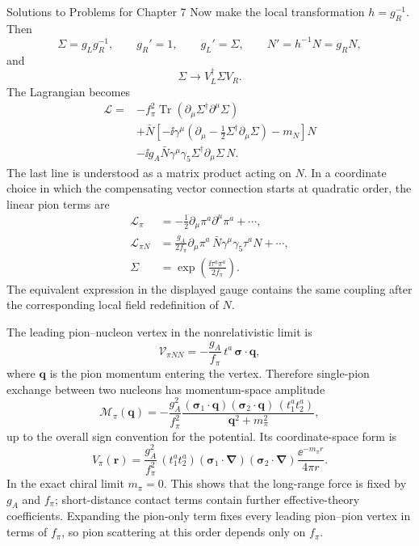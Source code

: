 \begin{bankssolutions}{Solutions to Problems for Chapter 7}
Now make the local transformation $h=g_R^{-1}$.  Then
\[
 \Sigma=g_Lg_R^{-1},\qquad g_R'=1,\qquad g_L'=\Sigma,\qquad
 N'=h^{-1}N=g_RN,
\]
and
\[
 \Sigma\longrightarrow V_L^\dagger\Sigma V_R.
\]
The Lagrangian becomes
\begin{align*}
 \mathcal L={}&-f_\pi^2\operatorname{Tr}(\partial_\mu\Sigma^\dagger\partial^\mu\Sigma)\\
 &+\bar N\left[-\ii\gamma^\mu
 \left(\partial_\mu-\frac12\Sigma^\dagger\partial_\mu\Sigma\right)
 -m_N\right]N\\
 &-\ii g_A\bar N\gamma^\mu\gamma_5
 \Sigma^\dagger\partial_\mu\Sigma\,N.
\end{align*}
The last line is understood as a matrix product acting on $N$.  In a
coordinate choice in which the compensating vector connection starts at
quadratic order, the linear pion terms are
\begin{align*}
 \mathcal L_\pi&=-\frac12\partial_\mu\pi^a\partial^\mu\pi^a+\cdots,\\
 \mathcal L_{\pi N}
 &=\frac{g_A}{2f_\pi}\partial_\mu\pi^a\,
 \bar N\gamma^\mu\gamma_5\tau^aN+\cdots,\\
 \Sigma&=\exp\left(\frac{\ii\tau^a\pi^a}{2f_\pi}\right).
\end{align*}
The equivalent expression in the displayed gauge contains the same
coupling after the corresponding local field redefinition of $N$.

The leading pion--nucleon vertex in the nonrelativistic limit is
\[
 \mathcal V_{\pi NN}
 =-\frac{g_A}{f_\pi}\,t^a\,
 \boldsymbol\sigma\cdot\mathbf q,
\]
where $\mathbf q$ is the pion momentum entering the vertex.  Therefore
single-pion exchange between two nucleons has momentum-space amplitude
\[
 \mathcal M_\pi(\mathbf q)
 =-\frac{g_A^2}{f_\pi^2}
 \frac{(\boldsymbol\sigma_1\cdot\mathbf q)
 (\boldsymbol\sigma_2\cdot\mathbf q)\,
 (t_1^at_2^a)}
 {\mathbf q^2+m_\pi^2},
\]
up to the overall sign convention for the potential.  Its coordinate-space
form is
\[
 V_\pi(\mathbf r)
 =\frac{g_A^2}{f_\pi^2}\,
 (t_1^at_2^a)(\boldsymbol\sigma_1\cdot\boldsymbol\nabla)
 (\boldsymbol\sigma_2\cdot\boldsymbol\nabla)
 \frac{\ee^{-m_\pi r}}{4\pi r}.
\]
In the exact chiral limit $m_\pi=0$.  This shows that the long-range force
is fixed by $g_A$ and $f_\pi$; short-distance contact terms contain further
effective-theory coefficients.  Expanding the pion-only term fixes every
leading pion--pion vertex in terms of $f_\pi$, so pion scattering at this
order depends only on $f_\pi$.


\end{bankssolutions}
